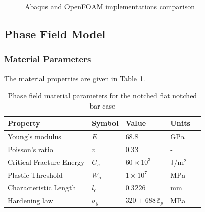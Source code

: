 \documentclass[sn-mathphys,Numbered,draft]{sn-jnl}%
\begin{document}
\begin{figure}[t!]
	\centering
		
		\caption{Abaqus and OpenFOAM implementations comparison}
	\label{label_for_entire_figure}
\end{figure}
\FloatBarrier


\subsection{Phase Field Model}


\subsubsection{Material Parameters}

The material properties are given in Table \ref{table:FNB_material_properties_phaseField}.

\begin{table}[htb]
	\centering
		\begin{tabular}{lllll} \hline
			Property & Symbol & Value & Units  \\ \hline 
			Young's modulus & $E$ & $68.8$ & GPa \\
			Poisson's ratio & $v$ & $0.33$  & - \\
			Critical Fracture Energy & $G_c$ & $60\times10^3$ &  J/m$^2$ \\
			Plastic Threshold & $W_o$ & $1\times10^7$ &  MPa \\
			Characteristic Length & $l_c$ & $0.3226$ &  mm    \\
			Hardening law & $\sigma_y$ & $320+688\, {\bar{\varepsilon}}_p$ &  MPa  \\
			\hline
		\end{tabular}
	\caption{Phase field material parameters for the notched flat notched bar case}
	\label{table:FNB_material_properties_phaseField}
\end{table}
\end{document}
